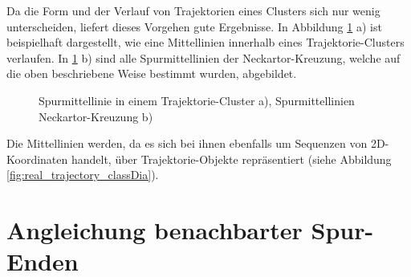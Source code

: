 Da die Form und der Verlauf von Trajektorien eines Clusters sich nur wenig unterscheiden, liefert dieses
Vorgehen gute Ergebnisse. In Abbildung \ref{fig:real2_results_centerline_detection} a) ist beispielhaft
dargestellt, wie eine Mittellinien innerhalb eines Trajektorie-Clusters verlaufen.
In \ref{fig:real2_results_centerline_detection} b) sind alle Spurmittellinien der Neckartor-Kreuzung,
welche auf die oben beschriebene Weise bestimmt wurden, abgebildet.

\begin{figure}[H]
    \centering
    \qquad
    \caption{Spurmittellinie in einem Trajektorie-Cluster a), Spurmittellinien Neckartor-Kreuzung b)}
    \label{fig:real2_results_centerline_detection}
\end{figure}

Die Mittellinien werden, da es sich bei ihnen ebenfalls um Sequenzen von 2D-Koordinaten handelt,
über Trajektorie-Objekte repräsentiert (siehe Abbildung \ref{fig:real_trajectory_classDia}).

\section{Angleichung benachbarter Spur-Enden}

